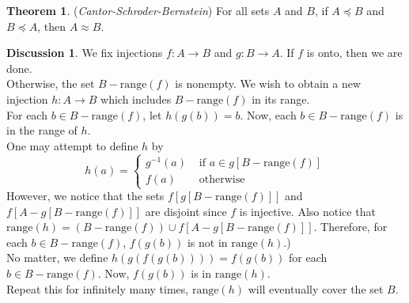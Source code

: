 \documentclass[14pt]{article}
\theoremstyle{definition}
\newtheorem*{discussion}{Discussion}
\newtheorem{theorem}[definition]{Theorem}
\newcommand{\fun}[3]{#1\colon #2\rightarrow#3}
\begin{document}
\begin{theorem}
(\textit{Cantor-Schroder-Bernstein}) For all sets $A$ and $B$, if $A\preceq B$ and $B\preceq A$, then $A\approx B$.
\end{theorem}
\begin{discussion}
We fix injections $\fun{f}{A}{B}$ and $\fun{g}{B}{A}$. If $f$ is onto, then we are done.\\
Otherwise, the set $B-\mathrm{range}(f)$ is nonempty. We wish to obtain a new injection
$\fun{h}{A}{B}$ which includes  $B-\mathrm{range}(f)$ in its range.\\
For each $b\in B-\mathrm{range}(f) $, let $h(g(b))=b$. Now, each $b\in B-\mathrm{range}(f)$
is in the range of $h$.\\
One may attempt to define $h$ by 
\begin{equation*}
    h(a)=\begin{cases}
        g^{-1}(a) & \text{ if }a\in g[B-\mathrm{range}(f)]\\
        f(a)    &  \text{ otherwise}
    \end{cases}
\end{equation*}
However, we notice that the sets $f[g[B-\mathrm{range}(f)]]$ and 
$f[A-g[B-\mathrm{range}(f)]]$ are disjoint since $f$ is injective.
Also notice that $\mathrm{range}(h)=(B-\mathrm{range}(f))\cup f[A-g[B-\mathrm{range}(f)]]$.
Therefore, for each $b\in B-\mathrm{range}(f)$, $f(g(b))$  is not in
$\mathrm{range}(h)$.)\\
No matter, we define $h(g(f(g(b))))=f(g(b))$ for each $b\in B-\mathrm{range}(f)$. 
Now, $f(g(b))$ is in $\mathrm{range}(h)$.\\
Repeat this for infinitely many times, $\mathrm{range}(h)$ will eventually cover 
the set $B$.
\end{discussion} 
\end{document}
